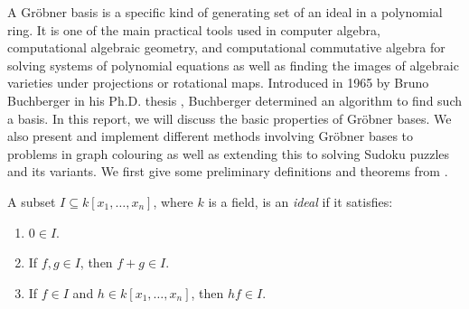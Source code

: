 \documentclass[../main.tex]{subfiles}
\begin{document}
   A Gr\"obner basis is a specific kind of generating set of an ideal in a polynomial ring. It is one of the main practical tools used in computer algebra, computational algebraic geometry, and computational commutative algebra for solving systems of polynomial equations as well as finding the images of algebraic varieties under projections or rotational maps. Introduced in 1965 by Bruno Buchberger in his Ph.D. thesis \cite{buchberger2006bruno}, Buchberger determined an algorithm to find such a basis. In this report, we will discuss the basic properties of Gr\"obner bases. We also present and implement different methods involving Gr\"obner bases to problems in graph colouring as well as extending this to solving Sudoku puzzles and its variants. We first give some preliminary definitions and theorems from \cite{cox2013ideals}.

   \begin{definition}
      A subset $I\subseteq k[x_1,\dots,x_n]$, where $k$ is a field, is an \emph{ideal} if it satisfies:
      \begin{enumerate}
         \item $0\in I$.
         \item If $f,g\in I$, then $f+g\in I$.
         \item If $f\in I$ and $h \in k[x_1,\dots,x_n]$, then $hf\in I$.
      \end{enumerate}
   \end{definition}
\end{document}
